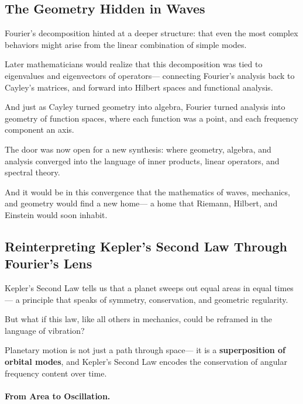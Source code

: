 \subsection*{The Geometry Hidden in Waves}

Fourier’s decomposition hinted at a deeper structure:  
that even the most complex behaviors might arise from the linear combination of simple modes.

Later mathematicians would realize that this decomposition was tied to eigenvalues and eigenvectors of operators—  
connecting Fourier’s analysis back to Cayley’s matrices, and forward into Hilbert spaces and functional analysis.

And just as Cayley turned geometry into algebra,  
Fourier turned analysis into geometry of function spaces,  
where each function was a point, and each frequency component an axis.

The door was now open for a new synthesis:  
where geometry, algebra, and analysis converged into the language of inner products, linear operators, and spectral theory.

And it would be in this convergence that the mathematics of waves, mechanics, and geometry would find a new home—  
a home that Riemann, Hilbert, and Einstein would soon inhabit.

\subsection*{Reinterpreting Kepler’s Second Law Through Fourier’s Lens}

Kepler’s Second Law tells us that a planet sweeps out equal areas in equal times—  
a principle that speaks of symmetry, conservation, and geometric regularity.

But what if this law, like all others in mechanics, could be reframed in the language of vibration?

\bigskip

\begin{tcolorbox}[colback=purple!5!white, colframe=purple!80!black, title=\textbf{Fourier's View: Kepler as Spectral Balance}]
Planetary motion is not just a path through space—  
it is a \textbf{superposition of orbital modes},  
and Kepler’s Second Law encodes the conservation of angular frequency content over time.
\end{tcolorbox}

\bigskip

\paragraph{From Area to Oscillation.}

